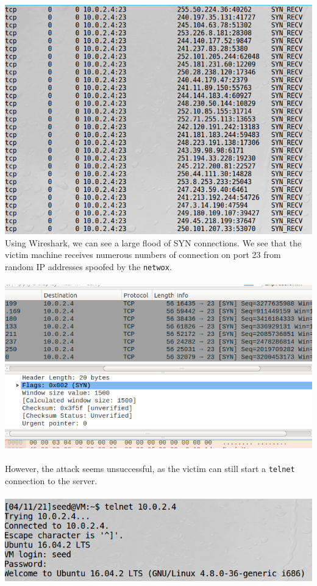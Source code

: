 \documentclass[a4paper]{article}
\begin{document}
\includegraphics[scale=0.7]{1/7.png}
\\Using Wireshark, we can see a large flood of SYN connections. We see that the victim machine receives numerous numbers of connection on port 23 from random IP addresses spoofed by the \verb+netwox+. \\\\
\includegraphics[scale=0.7]{1/7_1.png}\\\\
However, the attack seems unsuccessful, as the victim can still start a \verb+telnet+ connection to the server.\\\\
\includegraphics[scale=0.7]{1/4.png}\\\\
\end{document}
